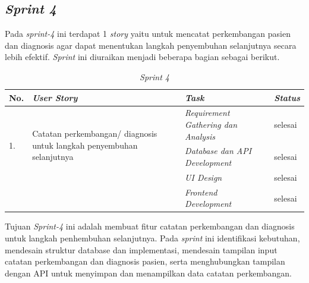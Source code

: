 \subsection{\textit{Sprint 4}}
Pada \textit{sprint-4} ini terdapat 1 \textit{story} yaitu untuk mencatat perkembangan pasien dan diagnosis agar dapat menentukan langkah penyembuhan selanjutnya secara lebih efektif. \textit{Sprint} ini diuraikan menjadi beberapa bagian sebagai berikut.
	\begin{table}[H]
	\caption{\textit{Sprint 4}}
	\label{sprint4_backlog}
	\begin{tabular}{@{} |p{0.5cm}|p{5cm}|p{5cm}|p{2cm}| @{}}
		\hline
		\textbf{No.} & \textbf{\textit{User Story}} & \textbf{\textit{Task}} & \textbf{\textit{Status}} \\
		\hline
		\multirow{3}{3cm}{1.} & \multirow{3}{5cm}{Catatan perkembangan/ diagnosis untuk langkah penyembuhan selanjutnya} & \textit{Requirement Gathering dan Analysis} & selesai\\
		\cline{3-4}
		 & & \textit{Database dan API Development} & selesai\\
		\cline{3-4}
		 & & \textit{UI Design} & selesai\\
		\cline{3-4}
		 & & \textit{Frontend Development} & selesai\\
		\hline
	\end{tabular}
	\end{table}
Tujuan \textit{Sprint-4} ini adalah membuat fitur catatan perkembangan dan diagnosis untuk langkah penhembuhan selanjutnya. Pada \textit{sprint} ini identifikasi kebutuhan, mendesain struktur database dan implementasi, mendesain tampilan input catatan perkembangan dan diagnosis pasien, serta menghubungkan tampilan dengan API untuk menyimpan dan menampilkan data catatan perkembangan.

